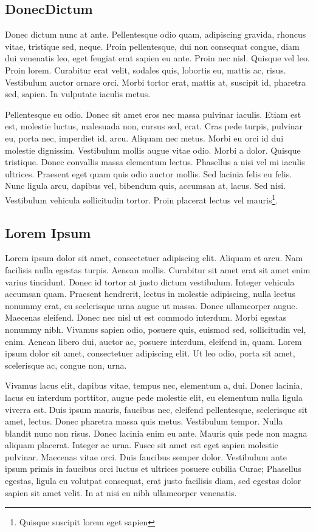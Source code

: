 \subsection{DonecDictum}\label{NullaPorta_Maecenus_DonecDictum}
Donec dictum nunc at ante. Pellentesque odio quam, adipiscing gravida, rhoncus vitae, tristique sed, neque. Proin pellentesque, dui non consequat congue, diam dui venenatis leo, eget feugiat erat sapien eu ante. Proin nec nisl. Quisque vel leo. Proin lorem. Curabitur erat velit, sodales quis, lobortis eu, mattis ac, risus. Vestibulum auctor ornare orci. Morbi tortor erat, mattis at, suscipit id, pharetra sed, sapien. In vulputate iaculis metus. 

Pellentesque eu odio. Donec sit amet eros nec massa pulvinar iaculis. Etiam est est, molestie luctus, malesuada non, cursus sed, erat. Cras pede turpis, pulvinar eu, porta nec, imperdiet id, arcu. Aliquam nec metus. Morbi eu orci id dui molestie dignissim. Vestibulum mollis augue vitae odio. Morbi a dolor. Quisque tristique. Donec convallis massa elementum lectus. Phasellus a nisi vel mi iaculis ultrices. Praesent eget quam quis odio auctor mollis. Sed lacinia felis eu felis. Nunc ligula arcu, dapibus vel, bibendum quis, accumsan at, lacus. Sed nisi. Vestibulum vehicula sollicitudin tortor. Proin placerat lectus vel mauris\footnote{Quisque suscipit lorem eget sapien}.


\subsection{Lorem Ipsum}\label{NullaPorta_Maecenus_LoremIpsum}
Lorem ipsum dolor sit amet, consectetuer adipiscing elit. Aliquam et arcu. Nam facilisis nulla egestas turpis. Aenean mollis. Curabitur sit amet erat sit amet enim varius tincidunt. Donec id tortor at justo dictum vestibulum. Integer vehicula accumsan quam. Praesent hendrerit, lectus in molestie adipiscing, nulla lectus nonummy erat, eu scelerisque urna augue ut massa. Donec ullamcorper augue. Maecenas eleifend. Donec nec nisl ut est commodo interdum. Morbi egestas nonummy nibh. Vivamus sapien odio, posuere quis, euismod sed, sollicitudin vel, enim. Aenean libero dui, auctor ac, posuere interdum, eleifend in, quam. Lorem ipsum dolor sit amet, consectetuer adipiscing elit. Ut leo odio, porta sit amet, scelerisque ac, congue non, urna. 

Vivamus lacus elit, dapibus vitae, tempus nec, elementum a, dui. Donec lacinia, lacus eu interdum porttitor, augue pede molestie elit, eu elementum nulla ligula viverra est. Duis ipsum mauris, faucibus nec, eleifend pellentesque, scelerisque sit amet, lectus. Donec pharetra massa quis metus. Vestibulum tempor. Nulla blandit nunc non risus. Donec lacinia enim eu ante. Mauris quis pede non magna aliquam placerat. Integer ac urna. Fusce sit amet est eget sapien molestie pulvinar. Maecenas vitae orci. Duis faucibus semper dolor. Vestibulum ante ipsum primis in faucibus orci luctus et ultrices posuere cubilia Curae; Phasellus egestas, ligula eu volutpat consequat, erat justo facilisis diam, sed egestas dolor sapien sit amet velit. In at nisi eu nibh ullamcorper venenatis. 



